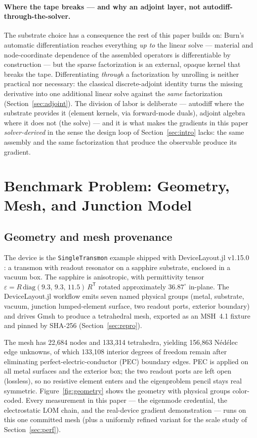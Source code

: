 \documentclass{anvil-paper}
\begin{document}
\paragraph{Where the tape breaks --- and why an adjoint layer, not
autodiff-through-the-solver.}
The substrate choice has a consequence the rest of this paper builds on:
Burn's automatic differentiation reaches everything \emph{up to} the
linear solve --- material and node-coordinate dependence of the assembled
operators is differentiable by construction --- but the sparse
factorization is an external, opaque kernel that breaks the tape.
Differentiating \emph{through} a factorization by unrolling is neither
practical nor necessary: the classical discrete-adjoint identity turns
the missing derivative into one additional linear solve against the
\emph{same} factorization (Section~\ref{sec:adjoint}). The division of
labor is deliberate --- autodiff where the substrate provides it (element
kernels, via forward-mode duals), adjoint algebra where it does not (the
solve) --- and it is what makes the gradients in this paper
\emph{solver-derived} in the sense the design loop of
Section~\ref{sec:intro} lacks: the same assembly and the same
factorization that produce the observable produce its gradient.

\section{Benchmark Problem: Geometry, Mesh, and Junction Model}
\label{sec:problem}

\subsection{Geometry and mesh provenance}
\label{sec:geometry}

The device is the \texttt{SingleTransmon} example shipped with
DeviceLayout.jl v1.15.0 \citep{devicelayout}: a transmon with readout
resonator on a sapphire substrate, enclosed in a vacuum box. The sapphire
is anisotropic, with permittivity tensor
$\varepsilon = R\,\mathrm{diag}(9.3,\, 9.3,\, 11.5)\,R^{\mathsf{T}}$
rotated approximately $36.87^\circ$ in-plane. The DeviceLayout.jl
workflow emits seven named physical groups (metal, substrate, vacuum,
junction lumped-element surface, two readout ports, exterior boundary)
and drives Gmsh \citep{gmsh} to produce a tetrahedral mesh, exported as
an MSH~4.1 fixture and pinned by SHA-256 (Section~\ref{sec:repro}).

The mesh has 22{,}684 nodes and 133{,}314 tetrahedra, yielding 156{,}863
N\'ed\'elec edge unknowns, of which 133{,}108 interior degrees of freedom
remain after eliminating perfect-electric-conductor (PEC) boundary edges.
PEC is applied on all metal surfaces and the exterior box; the two
readout ports are left open (lossless), so no resistive element enters
and the eigenproblem pencil stays real symmetric.
Figure~\ref{fig:geometry} shows the geometry with physical groups
color-coded. Every measurement in this paper --- the eigenmode
credential, the electrostatic LOM chain, and the real-device gradient
demonstration --- runs on this one committed mesh (plus a uniformly
refined variant for the scale study of Section~\ref{sec:perf}).
\end{document}
